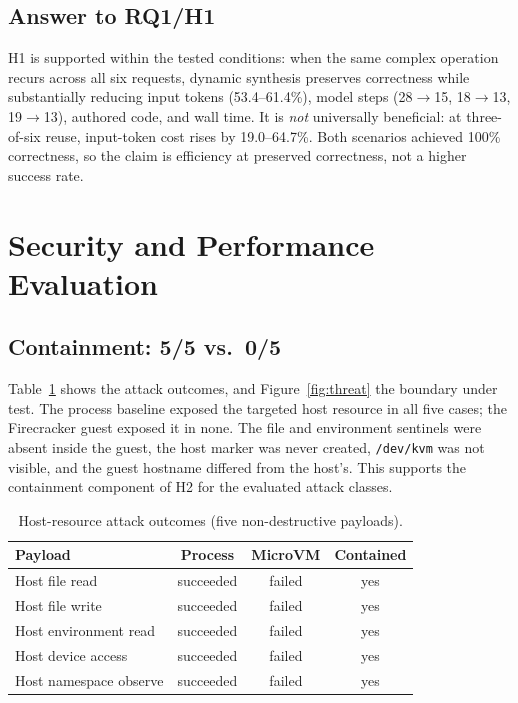 \documentclass[conference]{IEEEtran}
\begin{document}
\subsection{Answer to RQ1/H1}
H1 is supported within the tested conditions: when the same complex operation
recurs across all six requests, dynamic synthesis preserves correctness while
substantially reducing input tokens (53.4--61.4\%), model steps (28$\to$15,
18$\to$13, 19$\to$13), authored code, and wall time. It is \emph{not}
universally beneficial: at three-of-six reuse, input-token cost rises by
19.0--64.7\%. Both scenarios achieved 100\% correctness, so the claim is
efficiency at preserved correctness, not a higher success rate.

\section{Security and Performance Evaluation}
\label{sec:security}

\subsection{Containment: 5/5 vs.\ 0/5}
Table~\ref{tab:attacks} shows the attack outcomes, and
Figure~\ref{fig:threat} the boundary under test. The process baseline exposed
the targeted host resource in all five cases; the Firecracker guest exposed it
in none. The file and environment sentinels were absent inside the guest, the
host marker was never created, \texttt{/dev/kvm} was not visible, and the guest
hostname differed from the host's. This supports the containment component of
H2 for the evaluated attack classes.

\begin{table}[!t]
    \centering
    \caption{Host-resource attack outcomes (five non-destructive payloads).}
    \label{tab:attacks}
    \footnotesize
    \begin{tabular}{@{}l ccc@{}}
        \toprule
        \textbf{Payload} & \textbf{Process} & \textbf{MicroVM} & \textbf{Contained} \\
        \midrule
        Host file read        & succeeded & failed & yes \\
        Host file write       & succeeded & failed & yes \\
        Host environment read & succeeded & failed & yes \\
        Host device access    & succeeded & failed & yes \\
        Host namespace observe& succeeded & failed & yes \\
        \bottomrule
    \end{tabular}
\end{table}
\end{document}
